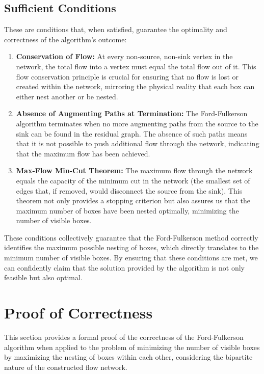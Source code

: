 \documentclass{article}
\begin{document}
    \subsection{Sufficient Conditions}
        These are conditions that, when satisfied, guarantee the optimality and correctness of the algorithm's outcome:
        \begin{enumerate}
            \item \textbf{Conservation of Flow:} At every non-source, non-sink vertex in the network, the total flow into a vertex must equal the total flow out of it. This flow conservation principle is crucial for ensuring that no flow is lost or created within the network, mirroring the physical reality that each box can either nest another or be nested.
            \item \textbf{Absence of Augmenting Paths at Termination:} The Ford-Fulkerson algorithm terminates when no more augmenting paths from the source to the sink can be found in the residual graph. The absence of such paths means that it is not possible to push additional flow through the network, indicating that the maximum flow has been achieved.
            \item \textbf{Max-Flow Min-Cut Theorem:} The maximum flow through the network equals the capacity of the minimum cut in the network (the smallest set of edges that, if removed, would disconnect the source from the sink). This theorem not only provides a stopping criterion but also assures us that the maximum number of boxes have been nested optimally, minimizing the number of visible boxes.
        \end{enumerate}
    
    These conditions collectively guarantee that the Ford-Fulkerson method correctly identifies the maximum possible nesting of boxes, which directly translates to the minimum number of visible boxes. By ensuring that these conditions are met, we can confidently claim that the solution provided by the algorithm is not only feasible but also optimal.

\section{Proof of Correctness}
    This section provides a formal proof of the correctness of the Ford-Fulkerson algorithm when applied to the problem of minimizing the number of visible boxes by maximizing the nesting of boxes within each other, considering the bipartite nature of the constructed flow network.
    
\end{document}
